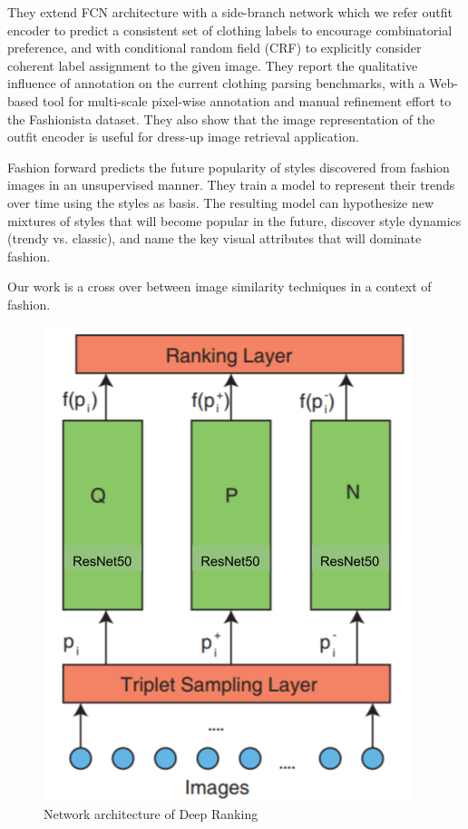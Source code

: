 They extend FCN architecture with a side-branch network which we refer outfit encoder to predict a consistent set of clothing labels to encourage combinatorial preference, and
with conditional random field (CRF) to explicitly consider coherent label assignment to the given image. They report the qualitative influence of annotation on the current clothing parsing benchmarks, with a Web-based tool for multi-scale pixel-wise annotation and manual refinement effort to the Fashionista dataset. They also show that the image representation of the outfit encoder is useful for dress-up image retrieval application.

Fashion forward\cite{al2017fashion} predicts the future popularity of styles discovered from fashion images in an unsupervised manner. They train a model to represent their trends over time using the styles as basis. The resulting model can hypothesize new mixtures of styles that will become popular in the future, discover style dynamics (trendy vs. classic), and name the key visual attributes that will dominate fashion. 

Our work is a cross over between image similarity techniques in a context of fashion.


\begin{figure}[tp!]
\centerline{\includegraphics[scale=0.5]{imgs/architecture.png}}
    \caption{Network architecture of Deep Ranking}
    \label{fig:architecture}
\end{figure}